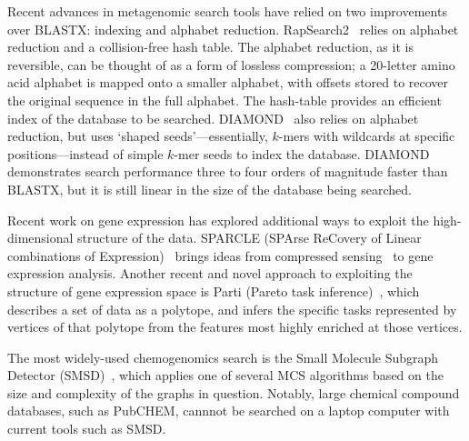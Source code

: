\documentclass{acm_proc_article-sp}
\begin{document}
Recent advances in metagenomic search tools have relied on two improvements over
BLASTX: indexing and alphabet reduction.
RapSearch2~\cite{zhao2012rapsearch2} relies on alphabet reduction and a 
collision-free hash table.
The alphabet reduction, as it is reversible, can be thought of as a form of
lossless compression; a 20-letter amino acid alphabet is mapped onto a smaller
alphabet, with offsets stored to recover the original sequence in the full
alphabet.
The hash-table provides an efficient index of the database to be searched.
DIAMOND~\cite{buchfink2014fast} also relies on alphabet reduction, but uses
`shaped seeds'---essentially, $k$-mers with wildcards at specific positions---instead of simple $k$-mer seeds to index the database.
DIAMOND demonstrates search performance three to four orders of magnitude faster
than BLASTX, but it is still linear in the size of the database being searched.

Recent work on gene expression has explored additional ways to exploit the high-dimensional 
structure of the data.
SPARCLE (SPArse ReCovery of Linear combinations of Expression)~\cite{prat2011recovering}
brings ideas from compressed sensing~\cite{candes2005decoding} 
to gene expression analysis.
Another recent and novel approach to exploiting the structure of gene expression
space is Parti (Pareto task inference)~\cite{hart2015inferring}, which describes a set of
data as a polytope, and infers the specific tasks represented by vertices of
that polytope from the features most highly enriched at those vertices.

The most widely-used chemogenomics search is the Small Molecule Subgraph Detector 
(SMSD)~\cite{rahman2009small}, which applies one of several MCS algorithms based
on the size and complexity of the graphs in question.
Notably, large chemical compound databases, such as PubCHEM,
cannnot be searched on a laptop computer with current tools such as SMSD.
\end{document}
